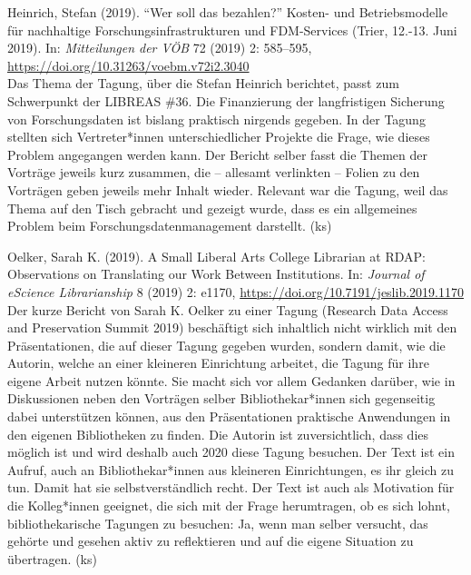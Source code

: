 \documentclass[a4paper,
fontsize=11pt,
oneside,
numbers=noperiodatend,
parskip=half-,
bibliography=totoc,
final
]{scrartcl}
\begin{document}
Heinrich, Stefan (2019). ``Wer soll das bezahlen?'' Kosten- und
Betriebsmodelle für nachhaltige Forschungsinfrastrukturen und
FDM-Services (Trier, 12.-13. Juni 2019). In: \emph{Mitteilungen der VÖB}
72 (2019) 2: 585--595, \url{https://doi.org/10.31263/voebm.v72i2.3040}\\
Das Thema der Tagung, über die Stefan Heinrich berichtet, passt zum
Schwerpunkt der LIBREAS \#36. Die Finanzierung der langfristigen
Sicherung von Forschungsdaten ist bislang praktisch nirgends gegeben. In
der Tagung stellten sich Vertreter*innen unterschiedlicher Projekte die
Frage, wie dieses Problem angegangen werden kann. Der Bericht selber
fasst die Themen der Vorträge jeweils kurz zusammen, die -- allesamt
verlinkten -- Folien zu den Vorträgen geben jeweils mehr Inhalt wieder.
Relevant war die Tagung, weil das Thema auf den Tisch gebracht und
gezeigt wurde, dass es ein allgemeines Problem beim
Forschungsdatenmanagement darstellt. (ks)

Oelker, Sarah K. (2019). A Small Liberal Arts College Librarian at RDAP:
Observations on Translating our Work Between Institutions. In:
\emph{Journal of eScience Librarianship} 8 (2019) 2: e1170,
\url{https://doi.org/10.7191/jeslib.2019.1170}\\
Der kurze Bericht von Sarah K. Oelker zu einer Tagung (Research Data
Access and Preservation Summit 2019) beschäftigt sich inhaltlich nicht
wirklich mit den Präsentationen, die auf dieser Tagung gegeben wurden,
sondern damit, wie die Autorin, welche an einer kleineren Einrichtung
arbeitet, die Tagung für ihre eigene Arbeit nutzen könnte. Sie macht
sich vor allem Gedanken darüber, wie in Diskussionen neben den Vorträgen
selber Bibliothekar*innen sich gegenseitig dabei unterstützen können,
aus den Präsentationen praktische Anwendungen in den eigenen
Bibliotheken zu finden. Die Autorin ist zuversichtlich, dass dies
möglich ist und wird deshalb auch 2020 diese Tagung besuchen. Der Text
ist ein Aufruf, auch an Bibliothekar*innen aus kleineren Einrichtungen,
es ihr gleich zu tun. Damit hat sie selbstverständlich recht. Der Text
ist auch als Motivation für die Kolleg*innen geeignet, die sich mit der
Frage herumtragen, ob es sich lohnt, bibliothekarische Tagungen zu
besuchen: Ja, wenn man selber versucht, das gehörte und gesehen aktiv zu
reflektieren und auf die eigene Situation zu übertragen. (ks)
\end{document}
